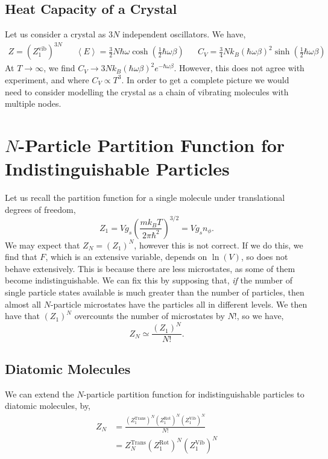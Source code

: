 \documentclass{book}
\begin{document}
\subsection{Heat Capacity of a Crystal}
Let us consider a crystal as $3N$ independent oscillators. We have,
\begin{align}
	Z = \left(Z_1^{\text{vib}}\right)^{3N} && \left<E\right> = \frac{3}{2}N\hbar\omega\cosh\left(\frac{1}{2}\hbar\omega\beta\right) && C_V = \frac{3}{4}Nk_B\left(\hbar\omega\beta\right)^2\sinh\left(\frac{1}{2}\hbar\omega\beta\right)
\end{align}
At $T \to \infty$, we find $C_V \to 3Nk_B\left(\hbar\omega\beta\right)^2e^{-\hbar\omega\beta}$. However, this does not agree with experiment, and where $C_V \propto T^3$. In order to get a complete picture we would need to consider modelling the crystal as a chain of vibrating molecules with multiple nodes.
\section{$N$-Particle Partition Function for Indistinguishable Particles}
Let us recall the partition function for a single molecule under translational degrees of freedom,
\begin{equation}
	Z_1 = Vg_s\left(\frac{mk_BT}{2\pi \hbar^2}\right)^{3/2} = Vg_sn_{\phi}.
\end{equation}
We may expect that $Z_N = (Z_1)^N$, however this is not correct. If we do this, we find that $F$, which is an extensive variable, depends on $\ln(V)$, so does not behave extensively. This is because there are less microstates, as some of them become indistinguishable. We can fix this by supposing that, \textit{if} the number of single particle states available is much greater than the number of particles, then almost all $N$-particle microstates have the particles all in different levels. We then have that $(Z_1)^N$ overcounts the number of microstates by $N!$, so we have,
\begin{equation}
	Z_N \simeq \frac{(Z_1)^N}{N!}. \label{eq:Z_N}
\end{equation}
\subsection{Diatomic Molecules}
We can extend the $N$-particle partition function for indistinguishable particles to diatomic molecules, by,
\begin{equation}
	\begin{split}
		Z_N & = \frac{\left(Z_1^{\text{Trans}}\right)^N\left(Z_1^{\text{Rot}}\right)^N\left(Z_1^{\text{Vib}}\right)^N}{N!} \\
		& = Z_N^{\text{Trans}}\left(Z_1^{\text{Rot}}\right)^N\left(Z_1^{\text{Vib}}\right)^N
	\end{split}
\end{equation}
\end{document}
